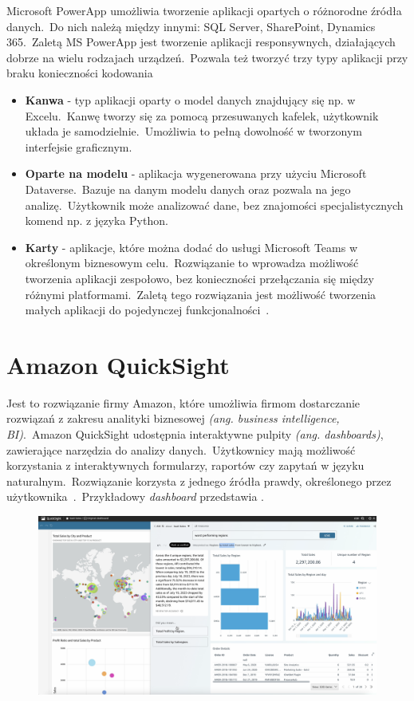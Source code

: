 Microsoft PowerApp umożliwia tworzenie aplikacji opartych o różnorodne źródła danych.\ Do nich należą między innymi: SQL Server, SharePoint, Dynamics 365.\ Zaletą MS PowerApp jest tworzenie aplikacji responsywnych, działających dobrze na wielu rodzajach urządzeń.\ Pozwala też tworzyć trzy typy aplikacji przy braku konieczności kodowania

\begin{itemize}
    \item \textbf{Kanwa} - typ aplikacji oparty o model danych znajdujący się np. w Excelu.\ Kanwę tworzy się za pomocą przesuwanych kafelek, użytkownik układa je samodzielnie.\ Umożliwia to pełną dowolność w tworzonym interfejsie graficznym.

    \item \textbf{Oparte na modelu} - aplikacja wygenerowana przy użyciu Microsoft Dataverse.\ Bazuje na danym modelu danych oraz pozwala na jego analizę.\ Użytkownik może analizować dane, bez znajomości specjalistycznych komend np. z języka Python.

    \item \textbf{Karty} - aplikacje, które można dodać do usługi Microsoft Teams w określonym biznesowym celu.\ Rozwiązanie to wprowadza możliwość tworzenia aplikacji zespołowo, bez konieczności przełączania się między różnymi platformami.\ Zaletą tego rozwiązania jest możliwość tworzenia małych aplikacji do pojedynczej funkcjonalności~\cite{Microsoft,Microsofta,Microsoftb,Microsoftc}.
\end{itemize}

\section{Amazon QuickSight}
Jest to rozwiązanie firmy Amazon, które umożliwia firmom dostarczanie rozwiązań z zakresu analityki biznesowej \textit{(ang. business intelligence, BI)}.\ Amazon QuickSight udostępnia interaktywne pulpity \textit{(ang. dashboards)}, zawierające narzędzia do analizy danych.\ Użytkownicy mają możliwość korzystania z interaktywnych formularzy, raportów czy zapytań w języku naturalnym.\ Rozwiązanie korzysta z jednego źródła prawdy, określonego przez użytkownika~\cite{AmazonQuickSight}.\ Przykładowy \textit{dashboard} przedstawia .
\begin{figure}[H]
    \centering
    \includegraphics[width=\textwidth]{images/amazon_qs}
    \label{fig:am-qs}
\end{figure}
\vfill
\clearpage

